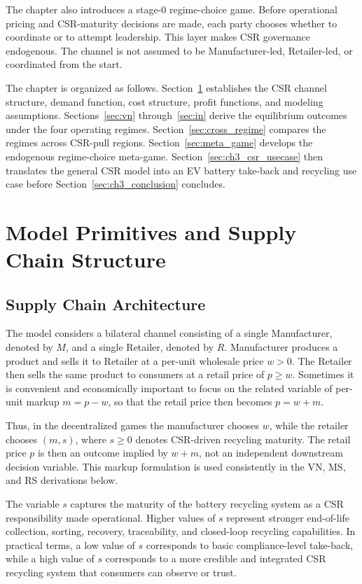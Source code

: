 The chapter also introduces a stage-0 regime-choice game. Before operational pricing and CSR-maturity decisions are made, each party chooses whether to coordinate or to attempt leadership. This layer makes CSR governance endogenous. The channel is not assumed to be Manufacturer-led, Retailer-led, or coordinated from the start.

The chapter is organized as follows. Section~\ref{sec:model_primitives} establishes the CSR channel structure, demand function, cost structure, profit functions, and modeling assumptions. Sections~\ref{sec:vn} through~\ref{sec:in} derive the equilibrium outcomes under the four operating regimes. Section~\ref{sec:cross_regime} compares the regimes across CSR-pull regions. Section~\ref{sec:meta_game} develops the endogenous regime-choice meta-game. Section~\ref{sec:ch3_csr_usecase} then translates the general CSR model into an EV battery take-back and recycling use case before Section~\ref{sec:ch3_conclusion} concludes.

\section{Model Primitives and Supply Chain Structure}
\label{sec:model_primitives}

\subsection{Supply Chain Architecture}

The model considers a bilateral channel consisting of a single Manufacturer, denoted by $M$, and a single Retailer, denoted by $R$. Manufacturer produces a product and sells it to Retailer at a per-unit wholesale price $w>0$. The Retailer then sells the same product to consumers at a retail price of $p \geq w $. Sometimes it is convenient and economically important to focus on the related variable of per-unit markup   $m = p-w$, so that the retail price then becomes  $p = w+m.$

Thus, in the decentralized games the manufacturer chooses $w$, while the retailer chooses $(m,s)$, where $s\geq 0$ denotes CSR-driven recycling maturity. The retail price $p$ is then an outcome implied by $w+m$, not an independent downstream decision variable. This markup formulation is used consistently in the VN, MS, and RS derivations below.

The variable $s$ captures the maturity of the battery recycling system as a CSR responsibility made operational. Higher values of $s$ represent stronger end-of-life collection, sorting, recovery, traceability, and closed-loop recycling capabilities. In practical terms, a low value of $s$ corresponds to basic compliance-level take-back, while a high value of $s$ corresponds to a more credible and integrated CSR recycling system that consumers can observe or trust.

